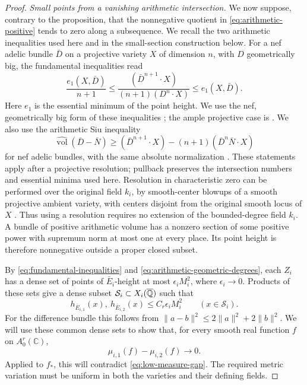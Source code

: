 \begin{proof}
\emph{Small points from a vanishing arithmetic intersection.}
We now suppose, contrary to the proposition, that the nonnegative
quotient in \eqref{eq:arithmetic-positive} tends to zero along a
subsequence.  We recall the two arithmetic inequalities used here and
in the small-section construction below.  For a nef adelic bundle
\(\bar D\) on a projective variety \(X\) of dimension \(n\), with
\(D\) geometrically big, the fundamental inequalities read
\begin{equation}\label{eq:fundamental-inequalities}
 \frac{e_1(X,\bar D)}{n+1}
 \le \frac{(\bar D^{n+1}\cdot X)}{(n+1)(D^n\cdot X)}
 \le e_1(X,\bar D).
\end{equation}
Here \(e_1\) is the essential minimum of the point height.  We use the
nef, geometrically big form of these inequalities
\cite[Theorem~5.3.3]{YuanZhang2021}; the ample projective case is
\cite[Theorem~1.10]{Zhang1995}.  We also use the arithmetic Siu inequality
\begin{equation}\label{eq:arithmetic-siu}
 \widehat{\operatorname{vol}}(\bar D-\bar N)
 \ge (\bar D^{n+1}\cdot X)
       -(n+1)(\bar D^n\bar N\cdot X)
\end{equation}
for nef adelic bundles, with the same absolute normalization
\cite[Theorem~A.5.1(2)]{YuanZhang2021}.
These statements apply after a projective resolution; pullback preserves
the intersection numbers and essential minima used here. Resolution in
characteristic zero can be performed over the original field \(k_i\),
by smooth-center blowups of a smooth projective ambient variety, with
centers disjoint from the original smooth locus of \(X\)
\cite[Theorems~1.0.2--1.0.3 and Section~5.7]{Wlodarczyk2005}.
Thus using a resolution
requires no extension of the bounded-degree field \(k_i\).  A bundle of
positive arithmetic volume has a nonzero section of some positive power
with supremum norm at most one at every place.  Its point height is
therefore nonnegative outside a proper closed subset.

By \eqref{eq:fundamental-inequalities} and
\eqref{eq:arithmetic-geometric-degrees}, each \(Z_i\) has a dense
set of points of \(\bar E_i\)-height at most \(\epsilon_iM_i^2\),
where \(\epsilon_i\to0\).  Products of these sets give a dense subset
\(\mathcal S_i\subset X_i(\overline{\mathbb Q})\) such that
\begin{equation}\label{eq:simultaneous-small-height}
 h_{\bar E_{i,1}}(x),\ h_{\bar E_{i,2}}(x)
 \le C_r\epsilon_iM_i^2\qquad(x\in\mathcal S_i).
\end{equation}
For the difference bundle this follows from
\(\|a-b\|^2\le2\|a\|^2+2\|b\|^2\).
We will use these common dense sets to show that, for every smooth real
function \(f\) on \(A_0^r(\mathbb C)\),
\begin{equation}\label{eq:low-measure-comparison}
 \mu_{i,1}(f)-\mu_{i,2}(f)\longrightarrow0.
\end{equation}
Applied to \(f_*\), this will contradict \eqref{eq:low-measure-gap}.
The required metric variation must be uniform in both the varieties and
their defining fields.


\end{proof}
